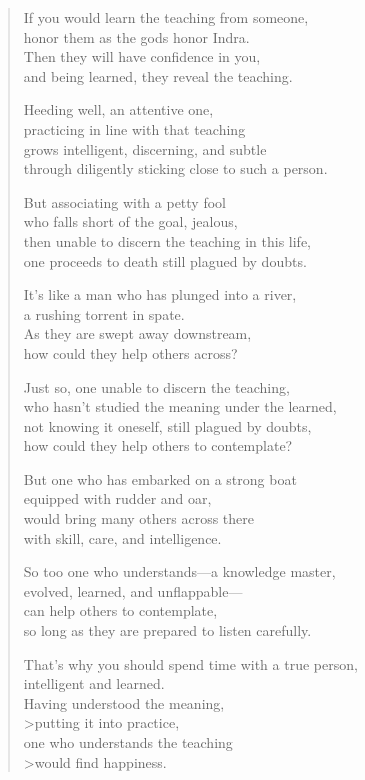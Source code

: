 \documentclass[12pt,openany]{book}%
\begin{document}
\begin{verse}%
If you would learn the teaching from someone, \\
honor them as the gods honor Indra. \\
Then they will have confidence in you, \\
and being learned, they reveal the teaching. 

Heeding well, an attentive one, \\
practicing in line with that teaching \\
grows intelligent, discerning, and subtle \\
through diligently sticking close to such a person. 

But associating with a petty fool \\
who falls short of the goal, jealous, \\
then unable to discern the teaching in this life, \\
one proceeds to death still plagued by doubts. 

It’s like a man who has plunged into a river, \\
a rushing torrent in spate. \\
As they are swept away downstream, \\
how could they help others across? 

Just so, one unable to discern the teaching, \\
who hasn’t studied the meaning under the learned, \\
not knowing it oneself, still plagued by doubts, \\
how could they help others to contemplate? 

But one who has embarked on a strong boat \\
equipped with rudder and oar, \\
would bring many others across there \\
with skill, care, and intelligence. 

So too one who understands—a knowledge master, \\
evolved, learned, and unflappable—\\
can help others to contemplate, \\
so long as they are prepared to listen carefully. 

That’s why you should spend time with a true person, \\
intelligent and learned. \\
Having understood the meaning, \\>putting it into practice, \\
one who understands the teaching \\>would find happiness. 

%
\end{verse}
\end{document}
